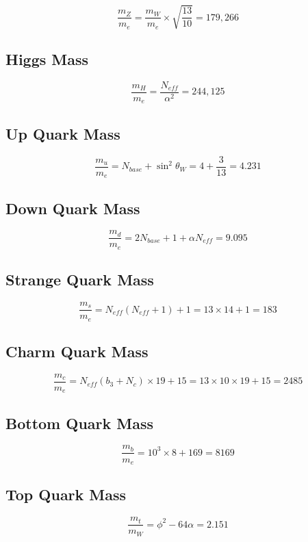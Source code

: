 \documentclass[
  11pt,
  letterpaper,
  twoside,
  openright]{book}
\begin{document}
\[
\frac{m_Z}{m_e} = \frac{m_W}{m_e} \times \sqrt{\frac{13}{10}} = 179{,}266
\]

\subsection{Higgs Mass}\label{higgs-mass}

\[
\frac{m_H}{m_e} = \frac{N_{eff}}{\alpha^2} = 244{,}125
\]

\subsection{Up Quark Mass}\label{up-quark-mass}

\[
\frac{m_u}{m_e} = N_{base} + \sin^2\theta_W = 4 + \frac{3}{13} = 4.231
\]

\subsection{Down Quark Mass}\label{down-quark-mass}

\[
\frac{m_d}{m_e} = 2N_{base} + 1 + \alpha N_{eff} = 9.095
\]

\subsection{Strange Quark Mass}\label{strange-quark-mass}

\[
\frac{m_s}{m_e} = N_{eff}(N_{eff}+1) + 1 = 13 \times 14 + 1 = 183
\]

\subsection{Charm Quark Mass}\label{charm-quark-mass}

\[
\frac{m_c}{m_e} = N_{eff}(b_3+N_c) \times 19 + 15 = 13 \times 10 \times 19 + 15 = 2485
\]

\subsection{Bottom Quark Mass}\label{bottom-quark-mass}

\[
\frac{m_b}{m_e} = 10^3 \times 8 + 169 = 8169
\]

\subsection{Top Quark Mass}\label{top-quark-mass}

\[
\frac{m_t}{m_W} = \phi^2 - 64\alpha = 2.151
\]
\end{document}
